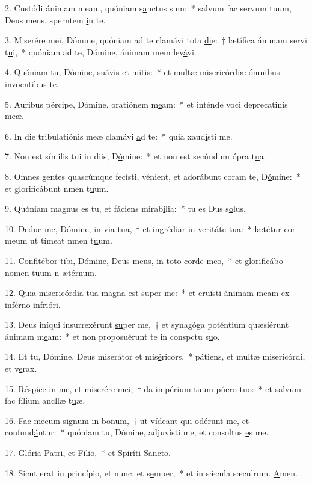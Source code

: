 2. Custódi ánimam meam, quóniam s\uline{a}nctus sum:~* salvum fac servum tuum, Deus meus, sperntem \uline{i}n te.\par 
3. Miserére mei, Dómine, quóniam ad te clamávi tota \uline{di}e:~† lætífica ánimam servi t\uline{u}i,~* quóniam ad te, Dómine, ánimam mem lev\uline{á}vi.\par 
4. Quóniam tu, Dómine, suávis et m\uline{i}tis:~* et multæ misericórdiæ ómnibus invocntib\uline{u}s te.\par 
5. Auribus pércipe, Dómine, oratiónem m\uline{e}am:~* et inténde voci deprecatinis m\uline{e}æ.\par 
6. In die tribulatiónis meæ clamávi \uline{a}d te:~* quia xaud\uline{í}sti me.\par 
7. Non est símilis tui in diis, D\uline{ó}mine:~* et non est secúndum ópra t\uline{u}a.\par 
8. Omnes gentes quascúmque fecísti, vénient, et adorábunt coram te, D\uline{ó}mine:~* et glorificábunt nmen t\uline{u}um.\par 
9. Quóniam magnus es tu, et fáciens mirab\uline{í}lia:~* tu es Dus s\uline{o}lus.\par 
10. Deduc me, Dómine, in via \uline{tu}a,~† et ingrédiar in veritáte t\uline{u}a:~* lætétur cor meum ut tímeat nmen t\uline{u}um.\par 
11. Confitébor tibi, Dómine, Deus meus, in toto corde m\uline{e}o,~* et glorificábo nomen tuum n æt\uline{é}rnum.\par 
12. Quia misericórdia tua magna est s\uline{u}per me:~* et eruísti ánimam meam ex inférno infri\uline{ó}ri.\par 
13. Deus iníqui insurrexérunt \uline{su}per me,~† et synagóga poténtium quæsiérunt ánimam m\uline{e}am:~* et non proposuérunt te in conspctu s\uline{u}o.\par 
14. Et tu, Dómine, Deus miserátor et mis\uline{é}ricors,~* pátiens, et multæ misericórdi, et v\uline{e}rax.\par 
15. Réspice in me, et miserére \uline{me}i,~† da impérium tuum púero t\uline{u}o:~* et salvum fac fílium ancllæ t\uline{u}æ.\par 
16. Fac mecum signum in \uline{bo}num,~† ut vídeant qui odérunt me, et confund\uline{á}ntur:~* quóniam tu, Dómine, adjuvísti me, et consoltus \uline{e}s me.\par 
17. Glória Patri, et F\uline{í}lio,~* et Spiríti S\uline{a}ncto.\par 
18. Sicut erat in princípio, et nunc, et s\uline{e}mper,~* et in sǽcula sæculrum. \uline{A}men.\par 
